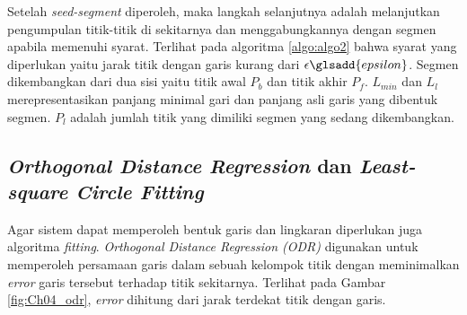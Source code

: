 Setelah \textit{seed-segment} diperoleh, maka langkah selanjutnya adalah melanjutkan pengumpulan titik-titik di sekitarnya dan menggabungkannya dengan segmen apabila memenuhi syarat. Terlihat pada algoritma \ref*{algo:algo2} bahwa syarat yang diperlukan yaitu jarak titik dengan garis kurang dari $\epsilon\glsadd{epsilon}$. Segmen dikembangkan dari dua sisi yaitu titik awal $P_b$ dan titik akhir $P_f$. $L_{min}$ dan $L_l$ merepresentasikan panjang minimal gari dan panjang asli garis yang dibentuk segmen. $P_l$ adalah jumlah titik yang dimiliki segmen yang sedang dikembangkan. 



\subsection{\textit{Orthogonal Distance Regression} dan \textit{Least-square Circle Fitting}}
\label{sec:Fitting}
Agar sistem dapat memperoleh bentuk garis dan lingkaran diperlukan juga algoritma \textit{fitting}. \textit{Orthogonal Distance Regression (ODR)} digunakan untuk memperoleh persamaan garis dalam sebuah kelompok titik dengan meminimalkan \textit{error} garis tersebut terhadap titik sekitarnya. Terlihat pada Gambar \ref*{fig:Ch04_odr}, \textit{error} dihitung dari jarak terdekat titik dengan garis\cite{d1}.%


